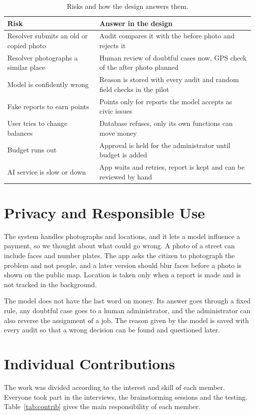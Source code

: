 \documentclass[conference,a4paper]{IEEEtran}
\begin{document}
\begin{table}[!t]\centering\footnotesize
\caption{Risks and how the design answers them.}\label{tab:risks}
\begin{tabular}{L{2.9cm}L{5.1cm}}\toprule
\textbf{Risk} & \textbf{Answer in the design}\\\midrule
Resolver submits an old or copied photo & Audit compares it with the before photo and rejects it\\
Resolver photographs a similar place & Human review of doubtful cases now, GPS check of the after photo planned\\
Model is confidently wrong & Reason is stored with every audit and random field checks in the pilot\\
Fake reports to earn points & Points only for reports the model accepts as civic issues\\
User tries to change balances & Database refuses, only its own functions can move money\\
Budget runs out & Approval is held for the administrator until budget is added\\
AI service is slow or down & App waits and retries, report is kept and can be reviewed by hand\\\bottomrule
\end{tabular}\end{table}

\section{Privacy and Responsible Use}
The system handles photographs and locations, and it lets a model influence a payment, so we thought about what could go wrong. A photo of a street can include faces and number plates. The app asks the citizen to photograph the problem and not people, and a later version should blur faces before a photo is shown on the public map. Location is taken only when a report is made and is not tracked in the background.

The model does not have the last word on money. Its answer goes through a fixed rule, any doubtful case goes to a human administrator, and the administrator can also reverse the assignment of a job. The reason given by the model is saved with every audit so that a wrong decision can be found and questioned later.

\section{Individual Contributions}
The work was divided according to the interest and skill of each member. Everyone took part in the interviews, the brainstorming sessions and the testing. Table~\ref{tab:contrib} gives the main responsibility of each member.
\end{document}

